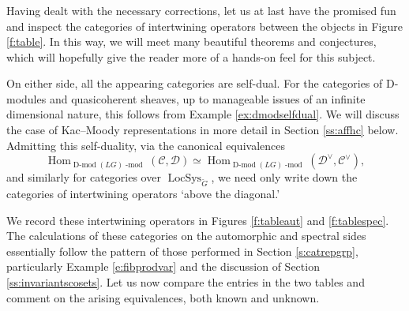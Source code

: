 \documentclass[10pt]{amsart}
\newcommand{\LS}{\on{LocSys}_{\cG}}
\newcommand{\on}{\operatorname}
\renewcommand{\mod}{\on{-mod}}
\newcommand{\Dmod}{\on{D-mod}}
\theoremstyle{remark}
\newtheorem{ex}[subsubsection]{Example}
\newcommand{\Hom}{\operatorname{Hom}}
\newcommand{\sD}{\mathscr{D}}
\numberwithin{equation}{section}
\newcommand{\cG}{\check{G}}
\newcommand{\sC}{\mathscr{C}}
\renewcommand{\mod}{\operatorname{-mod}}
\newcommand{\QCoh}{\on{QCoh}}
\begin{document}

\subsubsection{} Having dealt with the necessary corrections, let us at last 
have the promised fun and inspect the categories of intertwining operators 
between the 
objects in Figure \ref{f:table}. In this way, we will meet many beautiful theorems and conjectures, which will hopefully give the reader more of a hands-on feel for this subject. 

On either side, all the appearing categories are self-dual. For the categories of D-modules and quasicoherent sheaves, up to manageable issues of an infinite dimensional nature, this follows from Example \ref{ex:dmodselfdual}. We will discuss the case of Kac--Moody representations in more detail in Section \ref{ss:affhc} below. Admitting this self-duality, via the 
canonical equivalences
%
\[
\Hom_{\Dmod(LG)\mod}(\sC, \sD) \simeq \Hom_{\Dmod(LG)\mod}(\sD^\vee, \sC^\vee),
\]
%
and similarly for categories over $\LS$, we need only write down the categories 
of intertwining operators `above the diagonal.'

We record these intertwining operators in Figures \ref{f:tableaut} and \ref{f:tablespec}. The calculations of these categories on the automorphic and spectral sides 
essentially follow the pattern of those performed in Section 
\ref{s:catrepgrp}, particularly Example \ref{e:fibprodvar} and the discussion of Section \ref{ss:invariantscosets}. Let us now compare the entries in the two tables and 
comment on the arising equivalences, both known and unknown. 

\end{document}
